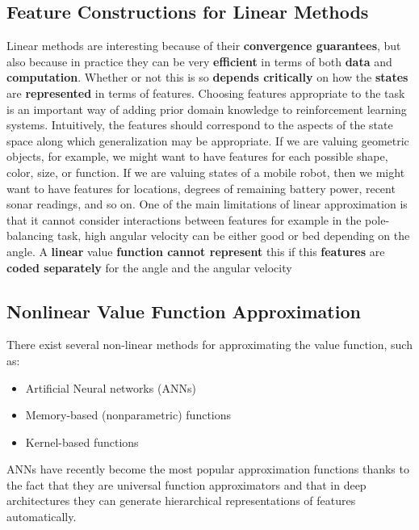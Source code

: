 \subsection{Feature Constructions for Linear Methods}
Linear methods are interesting because of their \textbf{convergence guarantees}, but also because in practice they can be very \textbf{efficient} in terms of both \textbf{data} and \textbf{computation}.
Whether or not this is so \textbf{depends critically} on how the \textbf{states} are \textbf{represented} in terms of features. Choosing features appropriate to the task is an important way of adding prior domain knowledge to reinforcement learning systems. Intuitively, the features should correspond to the aspects of the state space along which generalization may be appropriate. If we are valuing geometric objects, for example, we might want to have features for each possible shape, color, size, or function. If we are valuing states of a mobile robot, then we might want to have features for locations, degrees of remaining battery power, recent sonar readings, and so on. One of the main limitations of linear approximation is that it cannot consider interactions between features for example in the pole-balancing task, high angular velocity can be either good or bed depending on the angle.
A \textbf{linear} value \textbf{function cannot represent} this if this \textbf{features} are \textbf{coded separately} for the angle and the angular velocity

\subsection{Nonlinear Value Function Approximation}
There exist several non-linear methods for approximating the value
function, such as:
\begin{itemize}
    \item Artificial Neural networks (ANNs)
    \item Memory-based (nonparametric) functions
    \item Kernel-based functions
\end{itemize}
ANNs have recently become the most popular approximation functions thanks to the fact that they are universal function approximators and that in deep architectures they can generate hierarchical representations of features automatically.